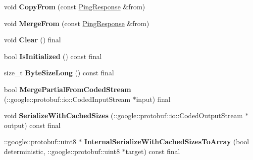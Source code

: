 \begin{DoxyCompactItemize}
\item 
\mbox{\label{classcoappbrpc_1_1api_1_1PingResponse_ac8f3f40a013b98a757d86bbd5c1ad24c}} 
void {\bfseries Copy\+From} (const \hyperlink{classcoappbrpc_1_1api_1_1PingResponse}{Ping\+Response} \&from)
\item 
\mbox{\label{classcoappbrpc_1_1api_1_1PingResponse_a92e982c66cb69c1825ae96abf0ae91a6}} 
void {\bfseries Merge\+From} (const \hyperlink{classcoappbrpc_1_1api_1_1PingResponse}{Ping\+Response} \&from)
\item 
\mbox{\label{classcoappbrpc_1_1api_1_1PingResponse_a1c181cb9be30e8ffca8609275fc90670}} 
void {\bfseries Clear} () final
\item 
\mbox{\label{classcoappbrpc_1_1api_1_1PingResponse_ab3f81781d626d1cb82d6d0a4e47b38a8}} 
bool {\bfseries Is\+Initialized} () const final
\item 
\mbox{\label{classcoappbrpc_1_1api_1_1PingResponse_aa03ecc6979567f31c74f0aa5df8e6193}} 
size\+\_\+t {\bfseries Byte\+Size\+Long} () const final
\item 
\mbox{\label{classcoappbrpc_1_1api_1_1PingResponse_ac5fd867e48773c1c95d506199eeb03d3}} 
bool {\bfseries Merge\+Partial\+From\+Coded\+Stream} (\+::google\+::protobuf\+::io\+::\+Coded\+Input\+Stream $\ast$input) final
\item 
\mbox{\label{classcoappbrpc_1_1api_1_1PingResponse_a96d3d78a38e881861ad54ae0fe785b4f}} 
void {\bfseries Serialize\+With\+Cached\+Sizes} (\+::google\+::protobuf\+::io\+::\+Coded\+Output\+Stream $\ast$output) const final
\item 
\mbox{\label{classcoappbrpc_1_1api_1_1PingResponse_a6ea377e998502b67dcfa659f7d2a839e}} 
\+::google\+::protobuf\+::uint8 $\ast$ {\bfseries Internal\+Serialize\+With\+Cached\+Sizes\+To\+Array} (bool deterministic, \+::google\+::protobuf\+::uint8 $\ast$target) const final
\item 

\end{DoxyCompactItemize}
